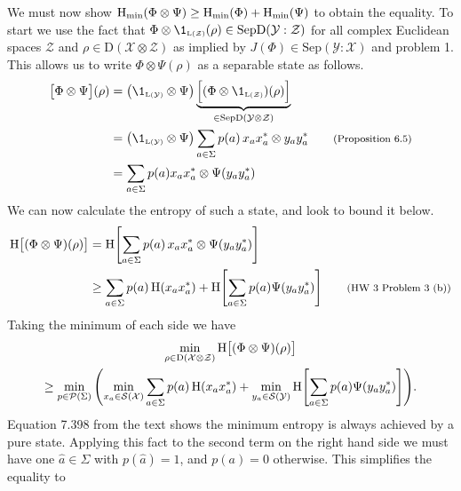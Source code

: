 \documentclass[boxes,pages,color=SeaGreen]{homework}
\renewcommand{\op}[1]{\operatorname{#1}}
\newcommand{\X}{\mathcal{X}}
\newcommand{\Y}{\mathcal{Y}}
\newcommand{\Z}{\mathcal{Z}}
\newcommand{\smalltag}[1]{\tag*{\footnotesize (#1)}}
\newcommand{\Lin}{\mathrm{L}}
\newcommand{\Density}{\mathrm{D}}
\newcommand{\Sep}{\mathrm{Sep}}
\newcommand{\SepD}{\mathrm{SepD}}
\begin{document}
\begin{solution}
  We must now show $\op{H}_{\text{min}}(\Phi\otimes\Psi) \geq \op{H}_{\text{min}}(\Phi) + \op{H}_{\textup{min}}(\Psi)$ to obtain the equality.
  To start we use the fact that $\Phi\otimes\1_{\mathsmaller{\Lin(\Z)}}(\rho) \in \SepD(\Y:\Z)$ for all complex Euclidean spaces $\Z$ and $\rho\in\Density(\X\otimes\Z)$ as implied by $J(\Phi)\in\Sep(\Y:\X)$ and problem 1.
  This allows us to write $\Phi\otimes\Psi(\rho)$ as a separable state as follows.
  \begin{align*}
    \qty\big[\Phi\otimes\Psi](\rho) & = \qty\big(\1_\mathsmaller{\Lin(\Y)}\otimes\Psi)\underbrace{\qty\Big[(\Phi\otimes\1_\mathsmaller{\Lin(\Z)})(\rho)]}_{\in\SepD(\Y\otimes\Z)} \\
                                    & = \qty\big(\1_\mathsmaller{\Lin(\Y)}\otimes\Psi)\sum_{a\in\Sigma} p(a)\, x_a x_a^* \otimes y_a y_a^* \smalltag{Proposition 6.5}             \\
                                    & = \sum_{a\in\Sigma}p(a) x_a x_a^* \otimes \Psi(y_a y_a^*)
  \end{align*}
  We can now calculate the entropy of such a state, and look to bound it below.
  \begin{align*}
    \op{H}\!\qty\big[\qty(\Phi\otimes\Psi)(\rho)] & = \op{H}\!\qty[\sum_{a\in\Sigma}p(a)\, x_a x_a^*\otimes \Psi(y_a y_a^*)]                                                       \\
                                                  & \geq \sum_{a\in\Sigma}p(a)\op{H}(x_a x_a^*) + \op{H}\!\qty[\sum_{a\in\Sigma}p(a)\Psi(y_a y_a^*)] \smalltag{HW 3 Problem 3 (b)}
  \end{align*}
  Taking the minimum of each side we have
  \begin{multline*}
    \min_{\rho\in\Density(\X\otimes\Z)}\op{H}\!\qty\big[\qty(\Phi\otimes\Psi)(\rho)]                                                                                                     \\
    \geq \min_{p\in\mathcal{P}(\Sigma)}\qty(\min_{x_a\in\mathcal{S}(\X)}\sum_{a\in\Sigma}p(a)\op{H}(x_a x_a^*) + \min_{y_a\in\mathcal{S}(\Y)}\op{H}\!\qty[\sum_{a\in\Sigma}p(a) \Psi(y_a y_a^*)]).
  \end{multline*}
  Equation 7.398 from the text shows the minimum entropy is always achieved by a pure state.
  Applying this fact to the second term on the right hand side we must have one $\hat{a}\in\Sigma$ with $p(\hat{a}) = 1$, and $p(a) = 0$ otherwise.
  This simplifies the equality to
  \begin{equation*}

\end{equation*}
\end{solution}
\end{document}
